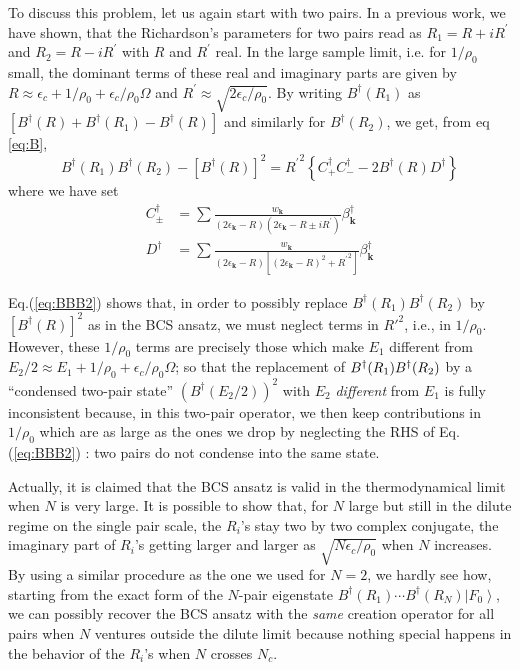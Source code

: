 \documentclass[aps,prb,superscriptaddress,showpacs,reprint,lengthcheck]{revtex4}
\newcommand{\vk}{\ensuremath{\mathbf{k}}}
\begin{document}
To discuss this problem, let us again start with two pairs. In
a previous work\cite{combescotBCS}, we have shown, that the Richardson's parameters for two pairs read as $R_1=R+iR^{\prime}$ and $R_2=R-i{}R^{\prime}$ with $R$
and $R^{\prime}$ real. In the
large sample limit, i.e. for $1/\rho_0$ small,  the dominant terms of these real and imaginary parts are given by $R\approx\epsilon_c+1/%
\rho_0+\epsilon_c/\rho_0\Omega$ and $R^{\prime}\approx\sqrt{2\epsilon_c/\rho_0}$. By writing $B^{\dagger}(R_1)$ as $\left[B^{\dagger}(R)+B^{\dagger}(R_1)-B^{\dagger}(R)\right]$ and similarly for  $B^{\dagger}(R_2)$, 
we get, from eq \eqref{eq:B}, 
\begin{equation}\label{eq:BBB2}
B^{\dagger}(R_1)B^{\dagger}(R_2)-\left[B^{\dagger}(R)\right]
^2={R^{\prime}}^2\left\{C^{\dagger}_+C^{\dagger}_--2B^{\dagger}(R)D^{\dagger}%
\right\} 
\end{equation}
where we have set 
\begin{align}
C^{\dagger}_{\pm}&=\sum\frac{w_\vk}{\left(2\epsilon_\vk-R\right)
\left(2\epsilon_\vk-R\pm{}iR^{\prime}\right) }\beta^{\dagger}_\vk \\
D^{\dagger}&=\sum\frac{w_\vk}{\left(2\epsilon_\vk-R\right) \left[%
\left(2\epsilon_\vk-R\right) ^2+{}{R^{\prime}}^2\right] }\beta^{\dagger}_\vk
\end{align}

Eq.(\ref{eq:BBB2}) shows that, in order to possibly replace $B^{\dagger}(R_1)B^{\dagger}(R_2)$ by $\left[B^{\dagger}(R)\right]
^2$ as in the BCS ansatz, we must neglect terms in $R'^2$, i.e., in $1/\rho_0$. However, these $1/\rho_0$ terms are precisely those which make $E _1$ different from $E _2/2\approx E_1+1/\rho_0+\epsilon_c/\rho_0\Omega$; so that the replacement of $B^{\dagger}(R_1)B^{%
\dagger}(R_2)$ by a ``condensed two-pair state'' $\left(B^{\dagger}(E _2/2)\right) ^2$ with $E_2$ \emph{different }from $E_1$ is fully inconsistent because, in this two-pair
operator, we then keep contributions in $1/\rho_0$ which are as large as the ones we drop
by neglecting the RHS of Eq.(\ref{eq:BBB2}) : two pairs do not condense into the same state.

Actually, it is claimed that the BCS ansatz is valid in the thermodynamical
limit when $N$ is very large. It is possible to show that, for $N$ large but still in the dilute regime on the single pair scale, the $R_i$'s stay two by two complex conjugate, the imaginary part of $R_i $'s getting larger and larger as $\sqrt{N\epsilon_c/\rho_0}$ when $N$ increases. By using a similar procedure as the one we used for $N=2$, we hardly see how, 
starting from the exact form of the $N$-pair eigenstate $B^{\dagger}(R_1)\cdots{}B^{\dagger}(R_N)\left|F_0\right>  $, we can possibly recover the BCS ansatz with the \emph{same} 
creation operator for all  pairs when $N$ ventures outside the dilute limit because nothing special happens in the behavior of the $R_i$'s when $N$ crosses $N_c$. 
\end{document}
